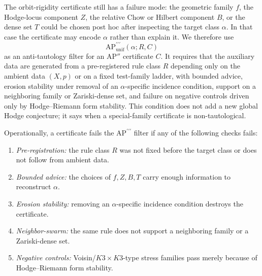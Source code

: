 \documentclass[aps,prd,twocolumn,superscriptaddress,nofootinbib]{revtex4-2}
\theoremstyle{definition}
\theoremstyle{remark}
\begin{document}
The orbit-rigidity certificate still has a failure mode: the geometric family $f$, the Hodge-locus component $Z$, the relative Chow or Hilbert component $B$, or the dense set $T$ could be chosen post hoc after inspecting the target class $\alpha$. In that case the certificate may encode $\alpha$ rather than explain it. We therefore use
\[
\mathrm{AP}^{\prime\prime\prime}_{\mathrm{unif}}(\alpha;R,C)
\]
as an anti-tautology filter for an $\mathrm{AP}''$ certificate $C$. It
requires that the auxiliary data are generated from a pre-registered rule
class $R$ depending only on the ambient data $(X,p)$ or on a fixed
test-family ladder, with bounded advice, erosion stability under removal of
an $\alpha$-specific incidence condition, support on a neighboring family
or Zariski-dense set, and failure on negative controls driven only by
Hodge--Riemann form stability. This condition does not add a new global
Hodge conjecture; it says when a special-family certificate is non-tautological.

Operationally, a certificate fails the $\mathrm{AP}^{\prime\prime\prime}$
filter if any of the following checks fails:
\begin{enumerate}
\item \emph{Pre-registration:} the rule class $R$ was not fixed before the
  target class or does not follow from ambient data.
\item \emph{Bounded advice:} the choices of $f,Z,B,T$ carry enough
  information to reconstruct $\alpha$.
\item \emph{Erosion stability:} removing an $\alpha$-specific incidence
  condition destroys the certificate.
\item \emph{Neighbor-swarm:} the same rule does not support a neighboring
  family or a Zariski-dense set.
\item \emph{Negative controls:} Voisin/$K3\times K3$-type stress families
  pass merely because of Hodge--Riemann form stability.
\end{enumerate}
\end{document}
